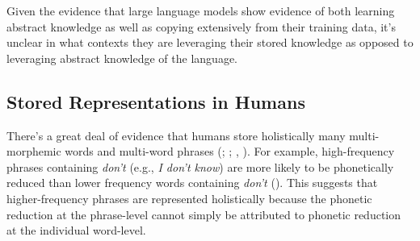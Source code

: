 \documentclass[
  12pt,
  letterpaper,
]{scrreprt}
\begin{document}
Given the evidence that large language models show evidence of both
learning abstract knowledge as well as copying extensively from their
training data, it's unclear in what contexts they are leveraging their
stored knowledge as opposed to leveraging abstract knowledge of the
language.

\subsection{Stored Representations in
Humans}\label{stored-representations-in-humans}

There's a great deal of evidence that humans store holistically many
multi-morphemic words and multi-word phrases
(;
;
,
). For example,
high-frequency phrases containing \emph{don't} (e.g., \emph{I don't
know}) are more likely to be phonetically reduced than lower frequency
words containing \emph{don't}
().
This suggests that higher-frequency phrases are represented holistically
because the phonetic reduction at the phrase-level cannot simply be
attributed to phonetic reduction at the individual word-level.
\end{document}
